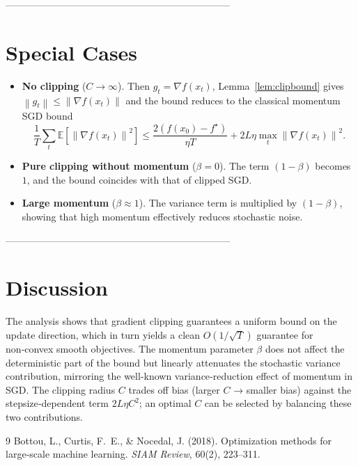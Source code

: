 \documentclass{article}
\newcommand{\E}{\mathbb{E}}
\newcommand{\norm}[1]{\left\lVert#1\right\rVert}
\begin{document}
---------------------------------------------------------------------

\section*{Special Cases}
\begin{itemize}
\item \textbf{No clipping} ($C\to\infty$).  
Then $g_{t}=\nabla f(x_{t})$, Lemma~\ref{lem:clipbound} gives $\norm{g_{t}}\le \norm{\nabla f(x_{t})}$ and the bound reduces to the classical momentum SGD bound
\[
\frac{1}{T}\sum_{t}\E[\norm{\nabla f(x_{t})}^{2}]
\le \frac{2(f(x_{0})-f^{\star})}{\eta T}+2L\eta\max_{t}\norm{\nabla f(x_{t})}^{2}.
\]
\item \textbf{Pure clipping without momentum} ($\beta=0$).  
The term $(1-\beta)$ becomes $1$, and the bound coincides with that of clipped SGD.
\item \textbf{Large momentum} ($\beta\approx1$).  
The variance term is multiplied by $(1-\beta)$, showing that high momentum effectively reduces stochastic noise.
\end{itemize}

---------------------------------------------------------------------

\section*{Discussion}
The analysis shows that gradient clipping guarantees a uniform bound on the update direction, which in turn yields a clean $O(1/\sqrt{T})$ guarantee for non‑convex smooth objectives.  The momentum parameter $\beta$ does not affect the deterministic part of the bound but linearly attenuates the stochastic variance contribution, mirroring the well‑known variance‑reduction effect of momentum in SGD.  The clipping radius $C$ trades off bias (larger $C$ → smaller bias) against the stepsize‑dependent term $2L\eta C^{2}$; an optimal $C$ can be selected by balancing these two contributions.

\begin{thebibliography}{9}
Bottou, L., Curtis, F.~E., \& Nocedal, J. (2018). Optimization methods for large‑scale machine learning. \emph{SIAM Review}, 60(2), 223–311.
\end{thebibliography}
\end{document}
